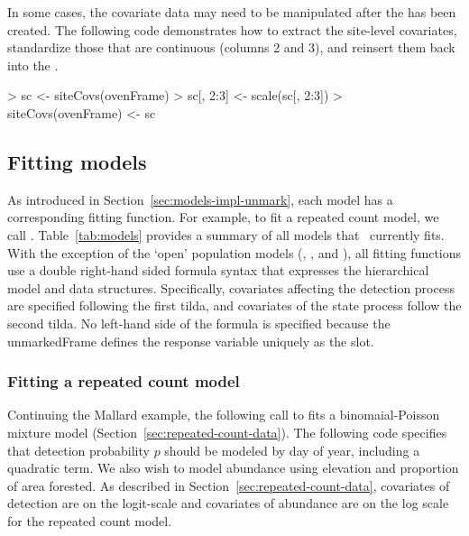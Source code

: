 \documentclass[article,shortnames]{jss}
\newcommand{\um}{\pkg{unmarked}}
\begin{document}
In some cases, the covariate data may need to be manipulated after the 
 has been created. The following code demonstrates 
how to extract the site-level covariates, standardize those that are 
continuous (columns 2 and 3), and reinsert them back into the 
.

\begin{Schunk}
\begin{Sinput}
> sc <- siteCovs(ovenFrame)
> sc[, 2:3] <- scale(sc[, 2:3])
> siteCovs(ovenFrame) <- sc
\end{Sinput}
\end{Schunk}



\subsection{Fitting models}
\label{sec:fitting-models}

As introduced in Section~\ref{sec:models-impl-unmark}, each model has a
corresponding fitting function.  For example, to fit a repeated count
model, we call .  Table~\ref{tab:models} provides a
summary of all models that \um\ currently fits.  With the exception of the 
`open' population models (, , and 
), all fitting functions use a double right-hand sided 
formula syntax that expresses the hierarchical model and data structures.  
Specifically, covariates affecting the detection process are specified 
following the first tilda, and covariates of the state process follow the 
second tilda. No left-hand side of the formula is specified because the 
unmarkedFrame defines the response variable uniquely as the  slot.

\subsubsection{Fitting a repeated count model}

Continuing the Mallard example, the following call to  fits a 
binomaial-Poisson mixture model (Section~\ref{sec:repeated-count-data}).  The 
following code specifies that detection probability $p$ should be modeled by 
day of year, including a quadratic term.  We also wish to model abundance 
using elevation and proportion of area forested.  As described in 
Section~\ref{sec:repeated-count-data}, covariates of detection are on the 
logit-scale and covariates of abundance are on the log scale for the 
repeated count model.
\end{document}
